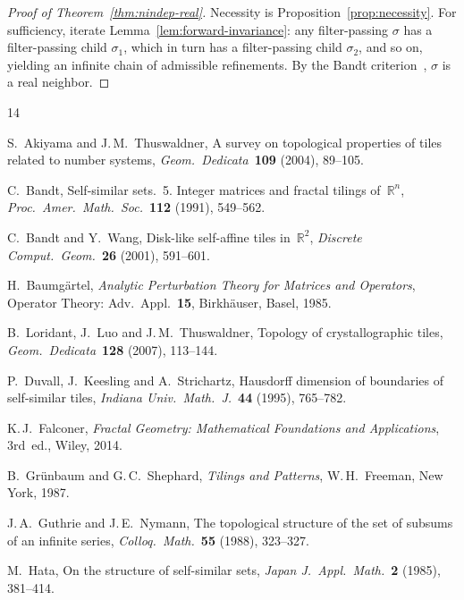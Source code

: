 \documentclass{amsart}
\theoremstyle{definition}
\theoremstyle{remark}
\newcommand{\R}{\mathbb{R}}
\begin{document}
\begin{proof}[Proof of Theorem~\ref{thm:nindep-real}]
Necessity is Proposition~\ref{prop:necessity}.  For sufficiency,
iterate Lemma~\ref{lem:forward-invariance}: any filter-passing
$\sigma$ has a filter-passing child $\sigma_1$, which in turn has
a filter-passing child $\sigma_2$, and so on, yielding an
infinite chain of admissible refinements.  By the Bandt
criterion~\cite{bandt1991,lau-ngai}, $\sigma$ is a real neighbor.
\end{proof}


\begin{thebibliography}{14}

S.~Akiyama and J.\,M.~Thuswaldner,
A survey on topological properties of tiles related to number systems,
\emph{Geom.\ Dedicata}\ \textbf{109} (2004), 89--105.

C.~Bandt,
Self-similar sets.~5. Integer matrices and fractal tilings of~$\R^n$,
\emph{Proc.\ Amer.\ Math.\ Soc.}\ \textbf{112} (1991), 549--562.

C.~Bandt and Y.~Wang,
Disk-like self-affine tiles in~$\R^2$,
\emph{Discrete Comput.\ Geom.}\ \textbf{26} (2001), 591--601.

H.~Baumg\"artel,
\emph{Analytic Perturbation Theory for Matrices and Operators},
Operator Theory: Adv.\ Appl.\ \textbf{15},
Birkh\"auser, Basel, 1985.

B.~Loridant, J.~Luo and J.\,M.~Thuswaldner,
Topology of crystallographic tiles,
\emph{Geom.\ Dedicata}\ \textbf{128} (2007), 113--144.

P.~Duvall, J.~Keesling and A.~Strichartz,
Hausdorff dimension of boundaries of self-similar tiles,
\emph{Indiana Univ.\ Math.\ J.}\ \textbf{44} (1995), 765--782.

K.\,J.~Falconer,
\emph{Fractal Geometry: Mathematical Foundations and Applications}, 3rd~ed.,
Wiley, 2014.

B.~Gr{\"u}nbaum and G.\,C.~Shephard,
\emph{Tilings and Patterns},
W.\,H.~Freeman, New York, 1987.

J.\,A.~Guthrie and J.\,E.~Nymann,
The topological structure of the set of subsums of an infinite
series,
\emph{Colloq.\ Math.}\ \textbf{55} (1988), 323--327.

M.~Hata,
On the structure of self-similar sets,
\emph{Japan J.\ Appl.\ Math.}\ \textbf{2} (1985), 381--414.


\end{thebibliography}
\end{document}
